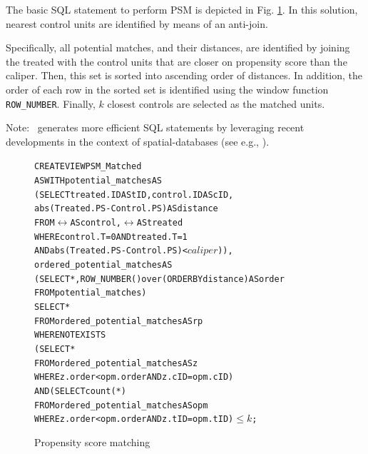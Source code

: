 {The basic SQL statement to perform PSM
is depicted in Fig. \ref{fig:nnmnr}.
In this solution,
nearest control units are identified
by means of an anti-join. 
Specifically, all potential matches, and their distances, are identified by
joining the treated with the control units that are closer on propensity score than
the caliper. Then, this set is sorted into ascending order of
distances.  In addition, the order of each row in the sorted set is identified
using the window function {\verb|ROW_NUMBER|}.
Finally, $k$ closest controls are selected as the matched units.

Note: \GSQL\  generates more efficient SQL statements by
leveraging recent developments in the context of spatial-databases
(see e.g., \cite{obe2015postgis}).



\begin{figure}
  \centering
\begin{alltt} \scriptsize
CREATE VIEW PSM_Matched
AS WITH potential_matches AS
  (SELECT treated.ID AS tID, control.ID AS cID,
          abs(Treated.PS-Control.PS)  AS distance
   FROM \(\rel\) AS control, \(\rel\) AS treated
   WHERE control.T=0 AND treated.T=1
     AND abs(Treated.PS-Control.PS) < \(caliper\))),
            ordered_potential_matches AS
  (SELECT *, ROW_NUMBER() over (ORDER BY distance) AS order
   FROM potential_matches)
SELECT *
FROM ordered_potential_matches AS rp
WHERE NOT EXISTS
    (SELECT *
     FROM ordered_potential_matches AS z
     WHERE z.order < opm.order AND z.cID=opm.cID)
  AND (SELECT count(*)
     FROM ordered_potential_matches AS opm
     WHERE z.order < opm.order AND z.tID=opm.tID)\( \leq k\);
\end{alltt} \vspace{-.3cm}
  \caption{ Propensity score matching}\label{fig:nnmnr}
\end{figure}


}
